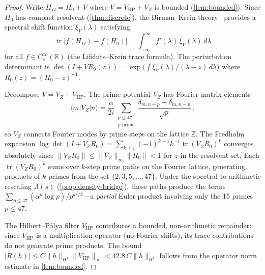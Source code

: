 \documentclass[11pt,a4paper]{article}
\theoremstyle{plain}
\theoremstyle{remark}
\newcommand{\Z}{\mathbb{Z}}
\newcommand{\R}{\mathbb{R}}
\newcommand{\norm}[1]{\lVert #1 \rVert}
\begin{document}
\begin{proof}
Write $H_D = H_0 + V$ where $V = V_{\mathrm{HP}}+V_Z$ is bounded
(\cref{lem:bounded}).  Since $H_0$ has compact resolvent
(\cref{thm:discrete}), the Birman--Krein
theory~\cite{birman-krein1962,lifshits1952} provides a spectral shift
function $\xi_V(\lambda)$ satisfying
\begin{equation}\label{eq:birman-krein}
  \operatorname{tr}\bigl[f(H_D)-f(H_0)\bigr]
  = \int_{-\infty}^\infty f'(\lambda)\,\xi_V(\lambda)\,d\lambda
\end{equation}
for all $f\in C_c^\infty(\R)$ (the Lifshits--Krein trace formula).
The perturbation determinant is
$\det(I+VR_0(z)) = \exp\!\bigl(\int \xi_V(\lambda)/(\lambda-z)\,d\lambda\bigr)$
where $R_0(z)=(H_0-z)^{-1}$.

Decompose $V=V_Z+V_{\mathrm{HP}}$.  The prime potential $V_Z$ has
Fourier matrix elements
\[
  \langle m|V_Z|n\rangle
  = \frac{\alpha}{2i}\sum_{\substack{p\leq 47\\p\text{ prime}}}
    \frac{\delta_{m,n+p}-\delta_{m,n-p}}{\sqrt{p}}\,,
\]
so $V_Z$ connects Fourier modes by prime steps on the lattice $\Z$.
The Fredholm expansion
$\log\det(I+V_Z R_0) = \sum_{k\geq 1}(-1)^{k+1}k^{-1}\operatorname{tr}(V_Z R_0)^k$
converges absolutely since $\norm{V_Z R_0}\leq\norm{V_Z}_\infty\norm{R_0}<1$
for $z$ in the resolvent set.  Each $\operatorname{tr}(V_Z R_0)^k$ sums
over $k$-step prime paths on the Fourier lattice, generating products of
$k$ primes from the set $\{2,3,5,\ldots,47\}$.  Under the
spectral-to-arithmetic rescaling $\Lambda(s)$ (\cref{prop:density-bridge}),
these paths produce the terms
$\sum_{p\leq 47} (\alpha^k\log p)/p^{ks/2}$---a \emph{partial} Euler
product involving only the 15 primes $p\leq 47$.

The Hilbert--P\'olya filter $V_{\mathrm{HP}}$ contributes a bounded,
non-arithmetic remainder: since $V_{\mathrm{HP}}$ is a multiplication
operator (no Fourier shifts), its trace contributions do not generate
prime products.  The bound
$|R(h)|\leq C\norm{h}_{H^1}\norm{V_{\mathrm{HP}}}_\infty < 42.8\,C\norm{h}_{H^1}$
follows from the operator norm estimate in \cref{lem:bounded}.
\end{proof}
\end{document}
